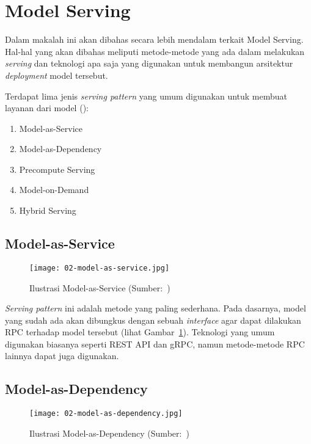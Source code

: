 \section{Model Serving}\label{chap:model-serving}

Dalam makalah ini akan dibahas secara lebih mendalam terkait Model Serving.
Hal-hal yang akan dibahas meliputi metode-metode yang ada dalam melakukan \textit{serving} dan teknologi apa saja yang digunakan untuk membangun arsitektur \textit{deployment} model tersebut.

Terdapat lima jenis \textit{serving pattern} yang umum digunakan untuk membuat layanan dari model (\cite{mlopsorg}):
\begin{enumerate}
  \item Model-as-Service
  \item Model-as-Dependency
  \item Precompute Serving
  \item Model-on-Demand
  \item Hybrid Serving
\end{enumerate}

\subsection{Model-as-Service}

\begin{figure}[ht]
  \centering
  \texttt{[image: 02-model-as-service.jpg]}
  \caption{Ilustrasi Model-as-Service (Sumber:~\cite{book-handsonml})}\label{fig:model-as-service}
\end{figure}

\textit{Serving pattern} ini adalah metode yang paling sederhana.
Pada dasarnya, model yang sudah ada akan dibungkus dengan sebuah \textit{interface} agar dapat dilakukan RPC terhadap model tersebut (lihat Gambar~\ref{fig:model-as-service}).
Teknologi yang umum digunakan biasanya seperti REST API dan gRPC, namun metode-metode RPC lainnya dapat juga digunakan.

\subsection{Model-as-Dependency}

\begin{figure}[ht]
  \centering
  \texttt{[image: 02-model-as-dependency.jpg]}
  \caption{Ilustrasi Model-as-Dependency (Sumber:~\cite{book-handsonml})}\label{fig:model-as-dependency}
\end{figure}

